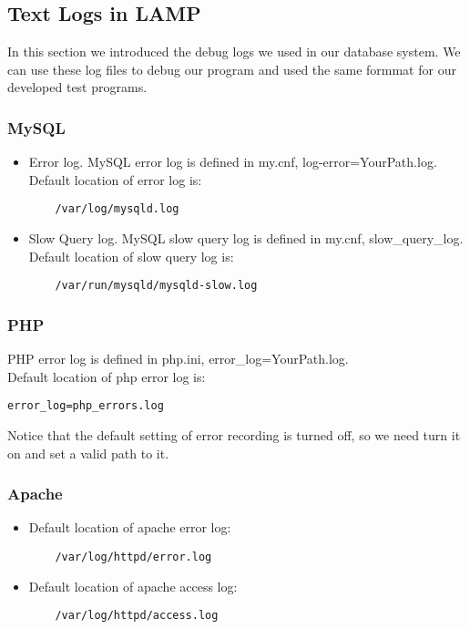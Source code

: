 \documentclass{article}
\begin{document}
\subsection{Text Logs in LAMP}
In this section we introduced the debug logs we used in our database system. 
We can use these log files to debug our program and used the same formmat for our developed test programs.
\subsubsection{MySQL}
\begin{itemize}
    \item
    Error log. MySQL error log is defined in my.cnf, log-error=YourPath.log.\\
    Default location of error log is:
    \begin{lstlisting}
    /var/log/mysqld.log
    \end{lstlisting}
    \item
    Slow Query log. MySQL slow query log is defined in my.cnf, slow\_query\_log.
    Default location of slow query log is:
    \begin{lstlisting}
    /var/run/mysqld/mysqld-slow.log
    \end{lstlisting}
\end{itemize}

\subsubsection{PHP}
PHP error log is defined in php.ini, error\_log=YourPath.log. \\
Default location of php error log is:
\begin{lstlisting}
error_log=php_errors.log
\end{lstlisting}
Notice that the default setting of error recording is turned off, so we need turn it on and set a valid path to it.

\subsubsection{Apache}
\begin{itemize}
    \item
    Default location of apache error log:
    \begin{lstlisting}
    /var/log/httpd/error.log
    \end{lstlisting}
    \item
    Default location of apache access log:
    \begin{lstlisting}
    /var/log/httpd/access.log
    \end{lstlisting}
\end{itemize}
\end{document}
